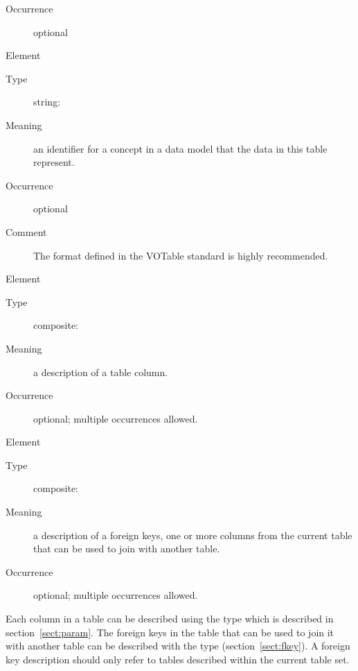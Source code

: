 \documentclass[11pt,a4paper]{ivoa}
\begin{document}
\begin{generated}
\begin{bigdescription}
\begin{description}
\item[Occurrence] optional

\end{description}
\item[Element \xmlel{utype}]
\begin{description}
\item[Type] string: 
\item[Meaning] 
                  an identifier for a concept in a data model that
                  the data in this table represent.  
               
\item[Occurrence] optional
\item[Comment] 
                  The format defined in the VOTable standard is highly
                  recommended. 
               

\end{description}
\item[Element \xmlel{column}]
\begin{description}
\item[Type] composite: 
\item[Meaning] 
                  a description of a table column.
               
\item[Occurrence] optional; multiple occurrences allowed.

\end{description}
\item[Element \xmlel{foreignKey}]
\begin{description}
\item[Type] composite: 
\item[Meaning] 
                  a description of a foreign keys, one or more columns
                  from the current table that can be used to join with 
                  another table.  
               
\item[Occurrence] optional; multiple occurrences allowed.

\end{description}


\end{bigdescription}\endgroup

\endgroup
\end{generated}





Each column in a table can be described using the
 type which is described in
section~\ref{sect:param}.  The foreign keys in the table that
can be used to join it with another table can be described with the
 type (section~\ref{sect:fkey}).
A foreign key description should only refer to tables described within
the current table set.  
\end{document}
